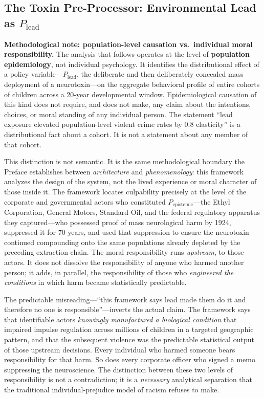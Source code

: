 \documentclass[12pt,openany]{book}
\begin{document}
\subsection{The Toxin Pre-Processor: Environmental Lead as \texorpdfstring{$P_{\text{lead}}$}{P\_lead}}

\textbf{Methodological note: population-level causation vs.\ individual moral responsibility.}
The analysis that follows operates at the level of \textbf{population epidemiology}, not individual psychology. It identifies the distributional effect of a policy variable---$P_{\text{lead}}$, the deliberate and then deliberately concealed mass deployment of a neurotoxin---on the aggregate behavioral profile of entire cohorts of children across a 20-year developmental window. Epidemiological causation of this kind does not require, and does not make, any claim about the intentions, choices, or moral standing of any individual person. The statement ``lead exposure elevated population-level violent crime rates by 0.8 elasticity'' is a distributional fact about a cohort. It is not a statement about any member of that cohort.

This distinction is not semantic. It is the same methodological boundary the Preface establishes between \textit{architecture} and \textit{phenomenology}: this framework analyzes the design of the system, not the lived experience or moral character of those inside it. The framework locates culpability precisely at the level of the corporate and governmental actors who constituted $P_{\text{epistemic}}$---the Ethyl Corporation, General Motors, Standard Oil, and the federal regulatory apparatus they captured---who possessed proof of mass neurological harm by 1924, suppressed it for 70 years, and used that suppression to ensure the neurotoxin continued compounding onto the same populations already depleted by the preceding extraction chain. The moral responsibility runs \textit{upstream}, to those actors. It does not dissolve the responsibility of anyone who harmed another person; it adds, in parallel, the responsibility of those who \textit{engineered the conditions} in which harm became statistically predictable.

The predictable misreading---``this framework says lead made them do it and therefore no one is responsible''---inverts the actual claim. The framework says that identifiable actors \textit{knowingly manufactured a biological condition} that impaired impulse regulation across millions of children in a targeted geographic pattern, and that the subsequent violence was the predictable statistical output of those upstream decisions. Every individual who harmed someone bears responsibility for that harm. So does every corporate officer who signed a memo suppressing the neuroscience. The distinction between these two levels of responsibility is not a contradiction; it is a \textit{necessary} analytical separation that the traditional individual-prejudice model of racism refuses to make.
\end{document}
